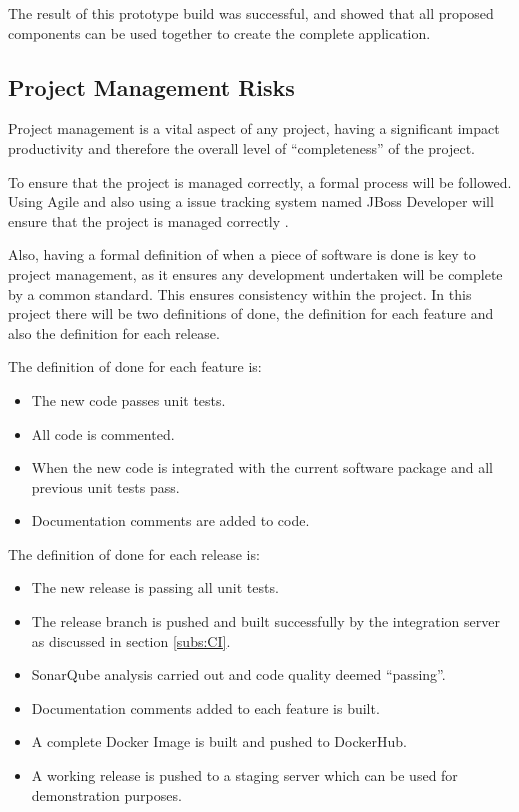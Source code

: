 The result of this prototype build was successful, and showed that all proposed components can be used together to create the complete application. 

\subsection{Project Management Risks}
Project management is a vital aspect of any project, having a significant impact productivity and therefore the overall level of ``completeness'' of the project. 

To ensure that the project is managed correctly, a formal process will be followed. Using Agile and also using a issue tracking system named JBoss Developer will ensure that the project is managed correctly \citep{JBoss2016}. 

Also, having a formal definition of when a piece of software is done is key to project management, as it ensures any development undertaken will be complete by a common standard. This ensures consistency within the project. In this project there will be two definitions of done, the definition for each feature and also the definition for each release.

The definition of done for each feature is:
\begin{itemize}
	\item The new code passes unit tests.
	\item All code is commented.
	\item When the new code is integrated with the current software package and all previous unit tests pass.
	\item Documentation comments are added to code.
\end{itemize}

The definition of done for each release is:
\begin{itemize}
	\item The new release is passing all unit tests.
	\item The release branch is pushed and built successfully by the integration server as discussed in section \ref{subs:CI}.
	\item SonarQube analysis carried out and code quality deemed ``passing''.
	\item Documentation comments added to each feature is built.
	\item A complete Docker Image is built and pushed to DockerHub.
	\item A working release is pushed to a staging server which can be used for demonstration purposes.
\end{itemize}
